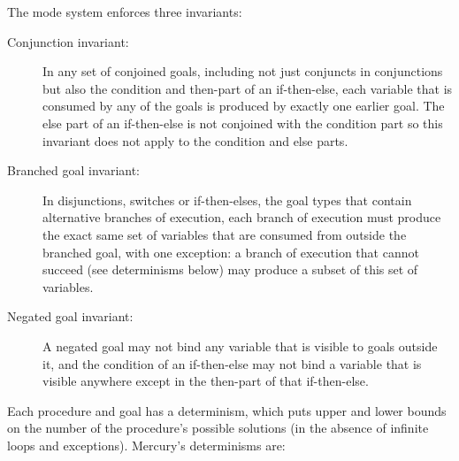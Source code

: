 The mode system enforces three invariants:

\begin{description}

  \item[Conjunction invariant:]
  In any set of conjoined goals,
  including not just conjuncts in conjunctions
  but also the condition and then-part of an if-then-else,
  each variable that is consumed by any of the goals
  is produced by exactly one earlier goal.
  The else part of an if-then-else is not conjoined with the condition part
  so this invariant does not apply to the condition and else parts.

  \item[Branched goal invariant:]
  In disjunctions, switches or if-then-elses,
  the goal types that contain alternative branches of execution,
  each branch of execution must produce
  the exact same set of variables
  that are consumed from outside the branched goal,
  with one exception:
  a branch of execution that cannot succeed (see determinisms below)
  may produce a subset of this set of variables.
  
  \item[Negated goal invariant:]
  A negated goal may not bind
  any variable that is visible to goals outside it,
  and the condition of an if-then-else may not bind a variable
  that is visible anywhere except in
  the then-part of that if-then-else.

\end{description}

\noindent
Each procedure and goal has a determinism,
which puts upper and lower bounds on the number of the procedure's possible
solutions
(in the absence of infinite loops and exceptions).
Mercury's determinisms are:

